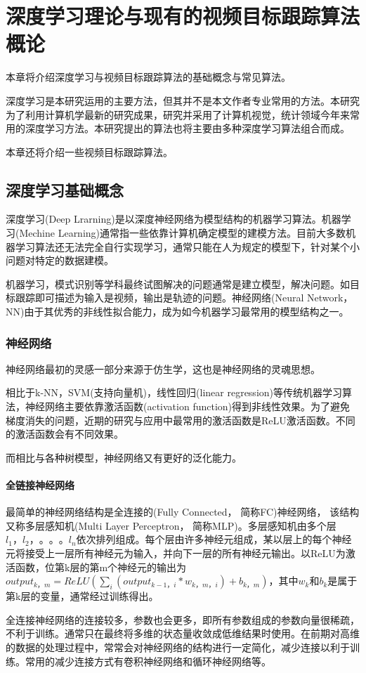 
\chapter{深度学习理论与现有的视频目标跟踪算法概论}
本章将介绍深度学习与视频目标跟踪算法的基础概念与常见算法。
\par
深度学习是本研究运用的主要方法，但其并不是本文作者专业常用的方法。本研究为了利用计算机学最新的研究成果，研究并采用了计算机视觉，统计领域今年来常用的深度学习方法。本研究提出的算法也将主要由多种深度学习算法组合而成。
\par
本章还将介绍一些视频目标跟踪算法。

\section{深度学习基础概念}
深度学习(Deep Lrarning)是以深度神经网络为模型结构的机器学习算法\supercite{deng2014deep}。机器学习(Mechine Learning)通常指一些依靠计算机确定模型的建模方法。目前大多数机器学习算法还无法完全自行实现学习，通常只能在人为规定的模型下，针对某个小问题对特定的数据建模。
\par
机器学习，模式识别等学科最终试图解决的问题通常是建立模型，解决问题。如目标跟踪即可描述为输入是视频，输出是轨迹的问题。神经网络(Neural Network， NN)由于其优秀的非线性拟合能力，成为如今机器学习最常用的模型结构之一。
\subsection{神经网络}
神经网络最初的灵感一部分来源于仿生学\supercite{mcculloch1943logical}\supercite{farley1954simulation}，这也是神经网络的灵魂思想。
\par
相比于k-NN，SVM(支持向量机)，线性回归(linear regression)等传统机器学习算法，神经网络主要依靠激活函数(activation function)得到非线性效果。为了避免梯度消失的问题，近期的研究与应用中最常用的激活函数是ReLU激活函数\supercite{krizhevsky2012imagenet}。不同的激活函数会有不同效果\supercite{karlik2011performance}。
\par
而相比与各种树模型，神经网络又有更好的泛化能力。
\par
\subsubsection{全链接神经网络}
\par
最简单的神经网络结构是全连接的(Fully Connected， 简称FC)神经网络， 该结构又称多层感知机(Multi Layer Perceptron， 简称MLP)。多层感知机由多个层$l_1，l_2，。。。l_n$依次排列组成。每个层由许多神经元组成，某以层上的每个神经元将接受上一层所有神经元为输入，并向下一层的所有神经元输出。以ReLU为激活函数，位第k层的第m个神经元的输出为$output_{k，m}=ReLU(\sum_{i} (output_{k-1，i}*w_{k，m，i})+b_{k，m})$，其中$w_{k}$和$b_{k}$是属于第k层的变量，通常经过训练得出。
\par
全连接神经网络的连接较多，参数也会更多，即所有参数组成的参数向量很稀疏，不利于训练。通常只在最终将多维的状态量收敛成低维结果时使用。在前期对高维的数据的处理过程中，常常会对神经网络的结构进行一定简化，减少连接以利于训练。常用的减少连接方式有卷积神经网络和循环神经网络等。
\par
